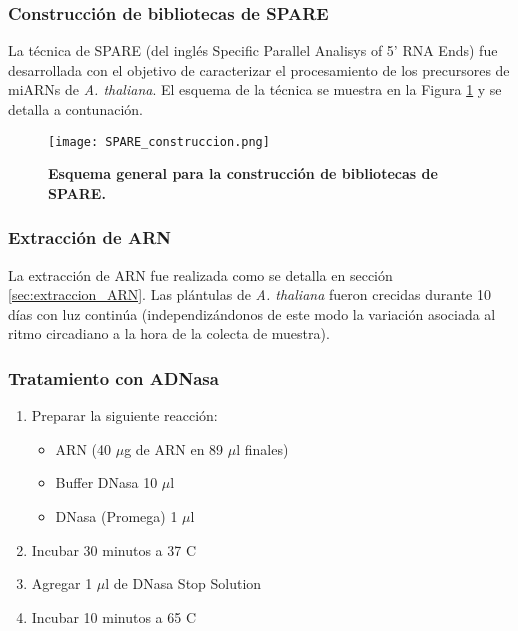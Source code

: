 \subsubsection{Construcción de bibliotecas de SPARE}

La técnica de SPARE (del inglés Specific Parallel Analisys of 5' RNA Ends) fue desarrollada con el objetivo de caracterizar el procesamiento de los precursores de miARNs de \textit{A. thaliana}.
El esquema de la técnica se muestra en la Figura \ref{fig:SPARE_construccion} y se detalla a contunación.

\begin{figure}[htbp!]
	\centering    
	\texttt{[image: SPARE\_construccion.png]}
	\caption[Esquema general para la construcción de bibliotecas de SPARE]{
		\textbf{Esquema general para la construcción de bibliotecas de SPARE.}
	}
	 \label{fig:SPARE_construccion}
\end{figure}

\subsubsection{Extracción de ARN}
La extracción de ARN fue realizada como se detalla en sección \ref{sec:extraccion_ARN}.
Las plántulas de \textit{A. thaliana} fueron crecidas durante 10 días con luz continúa (independizándonos de este modo la variación asociada al ritmo circadiano a la hora de la colecta de muestra).

\subsubsection{Tratamiento con ADNasa}

\begin{enumerate}
	\item Preparar la siguiente reacción:
		\begin{itemize}
			\item ARN (40 $\mu$g de ARN en 89 $\mu$l finales)
			\item Buffer DNasa 10 $\mu$l
			\item DNasa (Promega) 1 $\mu$l
		\end{itemize}
	\item Incubar 30 minutos a 37 \degree C
	\item Agregar 1 $\mu$l de DNasa Stop Solution
	\item Incubar 10 minutos a 65 \degree C
\end{enumerate}

